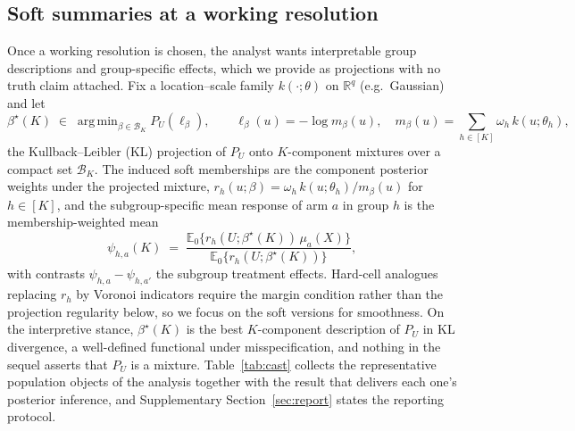 \documentclass[11pt]{article}
\newcommand{\E}{\mathbb E}
\newcommand{\R}{\mathbb R}
\DeclareMathOperator*{\argmin}{arg\,min}
\newcommand{\calB}{\mathcal B}
\begin{document}
\subsection{Soft summaries at a working resolution}\label{sec:soft}

Once a working resolution is chosen, the analyst wants interpretable group descriptions and group-specific effects, which we provide as projections with no truth claim attached. Fix a location--scale family $k(\cdot;\theta)$ on $\R^q$ (e.g.\ Gaussian) and let
\begin{equation}\label{eq:proj}
\beta^\star(K)\;\in\;\argmin_{\beta\in\calB_K}P_U(\ell_\beta),
\qquad \ell_\beta(u)=-\log m_\beta(u),\quad m_\beta(u)=\sum_{h\in[K]}\omega_h\,k(u;\theta_h),
\end{equation}
the Kullback--Leibler (KL) projection of $P_U$ onto $K$-component mixtures over a compact set $\calB_K$. The induced soft memberships are the component posterior weights under the projected mixture, $r_h(u;\beta)=\omega_h\,k(u;\theta_h) / m_\beta(u)$ for $h\in[K]$,
and the subgroup-specific mean response of arm $a$ in group $h$ is the membership-weighted mean
\begin{equation}\label{eq:effects}
\psi_{h,a}(K)\;=\;\frac{\E_0\{r_h(U;\beta^\star(K))\,\mu_a(X)\}}{\E_0\{r_h(U;\beta^\star(K))\}} ,
\end{equation}
with contrasts $\psi_{h,a}-\psi_{h,a'}$ the subgroup treatment effects. Hard-cell analogues replacing $r_h$ by Voronoi indicators require the margin condition rather than the projection regularity below, so we focus on the soft versions for smoothness. On the interpretive stance, $\beta^\star(K)$ is the best $K$-component description of $P_U$ in KL divergence, a well-defined functional under misspecification, and nothing in the sequel asserts that $P_U$ is a mixture. 
Table~\ref{tab:cast} collects the representative population objects of the analysis together with the result that delivers each one's posterior inference, 
and Supplementary Section~\ref{sec:report} states the reporting protocol.
\end{document}
